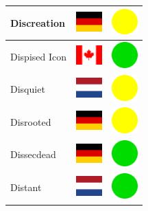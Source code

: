 \documentclass[12pt, a4paper, twoside]{report}
\begin{document}
\begin{center}
\begin{longtable}{|p{5cm}|p{2cm}|p{2cm}|}
Discreation & \includegraphics[width=1cm]{4x3/de} & \includegraphics[width=1cm]{likes/m} \\ \hline
Dispised Icon & \includegraphics[width=1cm]{4x3/ca} & \includegraphics[width=1cm]{likes/y} \\ \hline
Disquiet & \includegraphics[width=1cm]{4x3/nl} & \includegraphics[width=1cm]{likes/m} \\ \hline
Disrooted & \includegraphics[width=1cm]{4x3/de} & \includegraphics[width=1cm]{likes/m} \\ \hline
Dissecdead & \includegraphics[width=1cm]{4x3/de} & \includegraphics[width=1cm]{likes/y} \\ \hline
Distant & \includegraphics[width=1cm]{4x3/nl} & \includegraphics[width=1cm]{likes/y} \\ \hline

\end{longtable}
\end{center}
\end{document}
